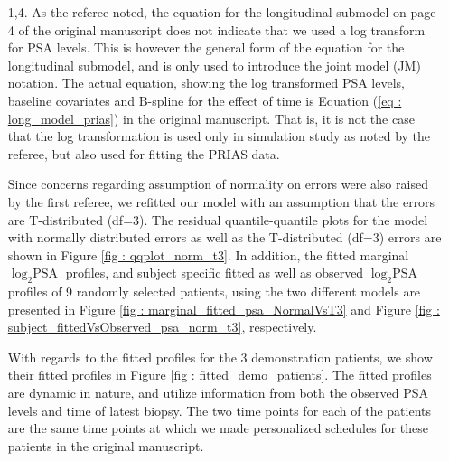 \begin{enumerate}
    \item [1,4.] 	
    As the referee noted, the equation for the longitudinal submodel on page 4 of the original manuscript does not indicate that we used a log transform for PSA levels. This is however the general form of the equation for the longitudinal submodel, and is only used to introduce the joint model (JM) notation. The actual equation, showing the log transformed PSA levels, baseline covariates and B-spline for the effect of time is Equation (\ref{eq : long_model_prias}) in the original manuscript. That is, it is not the case that the log transformation is used only in simulation study as noted by the referee, but also used for fitting the PRIAS data. 

    Since concerns regarding assumption of normality on errors were also raised by the first referee, we refitted our model with an assumption that the errors are T-distributed (df=3). The residual quantile-quantile plots for the model with normally distributed errors as well as the T-distributed (df=3) errors are shown in Figure \ref{fig : qqplot_norm_t3}. In addition, the fitted marginal $\log_2 \mbox{PSA}$ profiles, and subject specific fitted as well as observed $\log_2 \mbox{PSA}$ profiles of 9 randomly selected patients, using the two different models are presented in Figure \ref{fig : marginal_fitted_psa_NormalVsT3} and Figure \ref{fig : subject_fittedVsObserved_psa_norm_t3}, respectively.

    With regards to the fitted profiles for the 3 demonstration patients, we show their fitted profiles in Figure \ref{fig : fitted_demo_patients}. The fitted profiles are dynamic in nature, and utilize information from both the observed PSA levels and time of latest biopsy. The two time points for each of the patients are the same time points at which we made personalized schedules for these patients in the original manuscript.
    

\end{enumerate}
